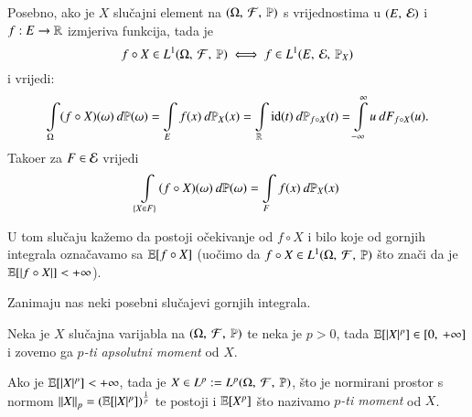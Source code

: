 Posebno, ako je $X$ slu\v cajni element na $(\Omega, \: \mathcal{F}, \: \mathbb{P})$ s vrijednostima u $({E}, \: {\mathcal{E}})$ i $f:E \to \mathbb{R}$ izmjeriva funkcija, tada je
\begin{equation*}
    f \circ X \in L^1 (\Omega, \: \mathcal{F}, \: \mathbb{P}) \iff f \in L^1 (E, \: \mathcal{E}, \: \mathbb{P}_X)
\end{equation*}
i vrijedi:
\begin{equation*}
    \int\limits_{\Omega} (f \circ X) (\omega) \: d \mathbb{P} (\omega)
    = \int\limits_E f(x) \: d \mathbb{P}_X (x)
    = \int\limits_{\mathbb{R}} \mathrm{id} (t) \: d \mathbb{P}_{f \circ X} (t)
    = \int\limits_{-\infty}^{\infty} u \: d F_{f \circ X} (u).
\end{equation*}
Tako\dj er za $F \in \mathcal{E}$ vrijedi
\begin{equation*}
    \int\limits_{\{ X \in F\}} (f \circ X) (\omega) \: d \mathbb{P} (\omega) = \int\limits_F f (x) \: d \mathbb{P}_X (x)
\end{equation*}

\begin{figure}[H]
    \centering
\end{figure}
U tom slu\v caju ka\v zemo da postoji o\v cekivanje od $f \circ X$ i bilo koje od gornjih integrala ozna\v cavamo sa $\mathbb{E} [f \circ X]$
(uo\v cimo da $f \circ X \in L^1 (\Omega, \: \mathcal{F}, \: \mathbb{P})$ \v sto zna\v ci da je $\mathbb{E} [|f \circ X|] < +\infty$).

Zanimaju nas neki posebni slu\v cajevi gornjih integrala.

\begin{defn}    \label{defn:5.11-4}
    Neka je $X$ slu\v cajna varijabla  na $(\Omega, \: \mathcal{F}, \: \mathbb{P})$ te neka je $p > 0$, tada $\mathbb{E} [ |X|^p ] \in [{0}, \:{+\infty}]$ i zovemo ga \emph{$p$-ti apsolutni moment} od $X$.
    
    Ako je $\mathbb{E} [ |X|^p ] < +\infty$, tada je $X \in L^p := L^p (\Omega, \: \mathcal{F}, \: \mathbb{P})$, \v sto je normirani prostor s normom $\left\lVert {X} \right\rVert_p = (\mathbb{E} [|X|^p])^{\frac{1}{p}}$ te postoji i $\mathbb{E} [ X^p ]$ \v sto nazivamo \emph{$p$-ti moment} od $X$.
\end{defn}


